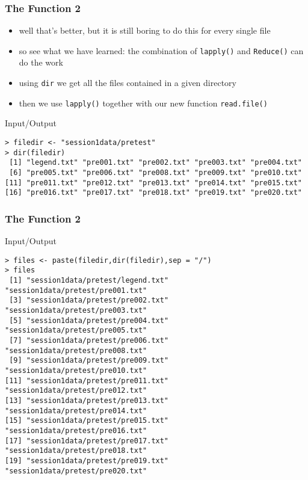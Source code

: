 \documentclass[xcolor={table},c]{beamer}
\begin{document}
\begin{frame}[fragile]\frametitle{The Function 2}
  \begin{itemize}
  \item well that's better, but it is still boring to do this for every single file
  \item so see what we have learned: the combination of \texttt{lapply()} and \texttt{Reduce()} can do the work 
  \item using \texttt{dir{}} we get all the files contained in a given directory
  \item then we use \texttt{lapply()} together with our new function \texttt{read.file()}
  \end{itemize}
  \begin{exampleblock}{Input/Output}\scriptsize
\begin{verbatim}
> filedir <- "session1data/pretest"
> dir(filedir)
 [1] "legend.txt" "pre001.txt" "pre002.txt" "pre003.txt" "pre004.txt"
 [6] "pre005.txt" "pre006.txt" "pre008.txt" "pre009.txt" "pre010.txt"
[11] "pre011.txt" "pre012.txt" "pre013.txt" "pre014.txt" "pre015.txt"
[16] "pre016.txt" "pre017.txt" "pre018.txt" "pre019.txt" "pre020.txt"
\end{verbatim}
  \end{exampleblock}
\end{frame}


\begin{frame}[fragile]\frametitle{The Function 2}
  \begin{exampleblock}{Input/Output}\scriptsize
\begin{verbatim}
> files <- paste(filedir,dir(filedir),sep = "/")
> files
 [1] "session1data/pretest/legend.txt" "session1data/pretest/pre001.txt"
 [3] "session1data/pretest/pre002.txt" "session1data/pretest/pre003.txt"
 [5] "session1data/pretest/pre004.txt" "session1data/pretest/pre005.txt"
 [7] "session1data/pretest/pre006.txt" "session1data/pretest/pre008.txt"
 [9] "session1data/pretest/pre009.txt" "session1data/pretest/pre010.txt"
[11] "session1data/pretest/pre011.txt" "session1data/pretest/pre012.txt"
[13] "session1data/pretest/pre013.txt" "session1data/pretest/pre014.txt"
[15] "session1data/pretest/pre015.txt" "session1data/pretest/pre016.txt"
[17] "session1data/pretest/pre017.txt" "session1data/pretest/pre018.txt"
[19] "session1data/pretest/pre019.txt" "session1data/pretest/pre020.txt"
\end{verbatim}
  \end{exampleblock}
\end{frame}
\end{document}
